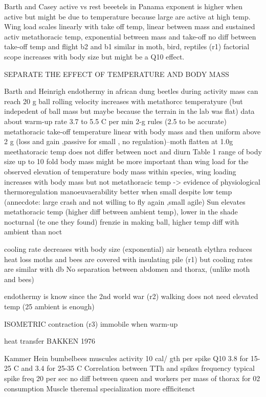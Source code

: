 Barth and Casey active vs rest beeetels in Panama
exponent is higher when active but might be due to temperature because large are active at high temp.
Wing load scales linearly with take off temp,  linear between mass and sustained activ metathoracic temp, exponential between mass and  take-off
no diff between take-off temp and flight  
b2 and b1 similar in moth, bird, reptiles (r1)
factorial scope increases with body size but might be a Q10 effect.

SEPARATE THE EFFECT OF TEMPERATURE AND BODY MASS

Barth and Heinrigh endothermy in african dung beetles during activity
mass can reach 20 g
ball rolling velocity increases with metathorcc temperatyure (but indepedent of ball mass but maybe because the terrain in the lab was flat)
data about warm-up rate 3.7 to 5.5 C per min
2-g rules (2.5 to be accurate) metathoracic take-off temperature linear with body mass and then uniform above 2 g (loss and gain ,passive for small , no regulation)--moth flatten at 1.0g
meethatoracic temp does not differ between noct and diurn
Table 1 range of body size up to 10 fold 
body mass might be more important than wing load for the observed elevation of temperature body mass
within species, wing loading increases with body mass but not metathoracic temp -> evidence of physiological thermoregulation
manoeuvaerability better when small despite low temp (annecdote: large crash and not willing to fly again ,small agile)
Sun elevates metathoracic temp (higher diff between ambient temp), lower in the shade 
nocturnal (te one they found)  frenzie in making ball, higher temp diff with ambient than noct

cooling rate decreases with body size (exponential) air beneath elythra reduces heat loss  
moths and bees are covered with insulating pile (r1) but cooling rates are similar with db
No separation between abdomen and thorax, (unlike moth and bees)

endothermy is know since the 2nd world war (r2)
walking does not need elevated temp (25 ambient is enough)

ISOMETRIC contraction (r3) immobile when warm-up

heat transfer BAKKEN 1976

Kammer Hein bumbelbees muscules activity
10 cal/ gth per spike
Q10 3.8 for 15-25 C and 3.4 for 25-35 C
Correlation between TTh and  spikes frequency
typical spike freq 20 per sec
no diff between queen and workers per mass of thorax for 02 consumption
Muscle theremal specialization more effficitenct


